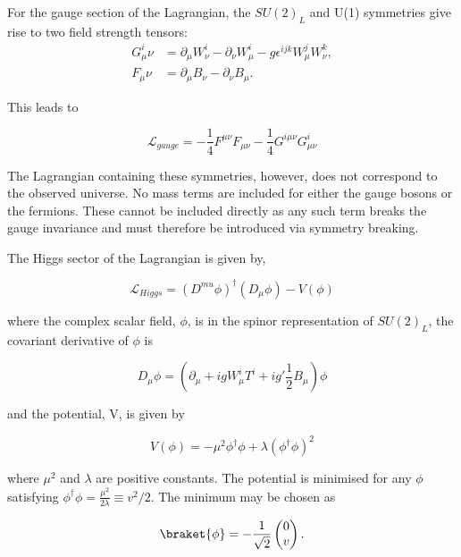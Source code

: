For the gauge section of the Lagrangian, the $SU(2)_L$ and U(1) symmetries give rise to two field strength tensors:
\begin{align}
G^i_\mu\nu &= \partial_\mu W^i_\nu - \partial_\nu W^i_\mu - g \epsilon^{ijk}W^j_\mu W^k_\nu,\\
F_\mu\nu &= \partial_\mu B_\nu - \partial_\nu B_\mu.
\end{align}

This leads to

\begin{equation}
\mathcal{L}_{gauge} = -\frac{1}{4}F^{\mu\nu}F_{\mu\nu} - \frac{1}{4}G^{i\mu\nu}G^{i}_{\mu\nu}
\end{equation}

The Lagrangian containing these symmetries, however, does not correspond to the observed universe. No mass terms
are included for either the gauge bosons or the fermions. These cannot be included directly as any such term breaks 
the gauge invariance and must therefore be introduced via symmetry breaking.

The Higgs sector of the Lagrangian is given by,

\begin{equation}
\label{equ:higgs-lagrangian}
\mathcal{L}_{Higgs} = (D^{mu}\phi)^{\dagger}(D_{\mu}\phi) - V(\phi)
\end{equation}

where the complex scalar field, $\phi$, is in the spinor representation of $SU(2)_L$, the covariant derivative of $\phi$ is

\begin{equation}
D_{\mu} \phi = (\partial_\mu + igW^i_{\mu}T^i + ig'\frac{1}{2}B_\mu)\phi 
\end{equation}

and the potential, V, is given by

\begin{equation}
V(\phi) =  - \mu^2\phi^{\dagger}\phi + \lambda \left(\phi^{\dagger}\phi\right)^2
\end{equation}

where $\mu^2$ and $\lambda$ are positive constants. The potential is minimised for any $\phi$ satisfying
$\phi^{\dagger}\phi = \frac{\mu^2}{2\lambda} \equiv v^2/2$. The minimum may be chosen as

\begin{equation}
\braket{\phi} =  - \frac{1}{\sqrt{2}}\begin{pmatrix} 0 \\ v\end{pmatrix}.
\end{equation}

